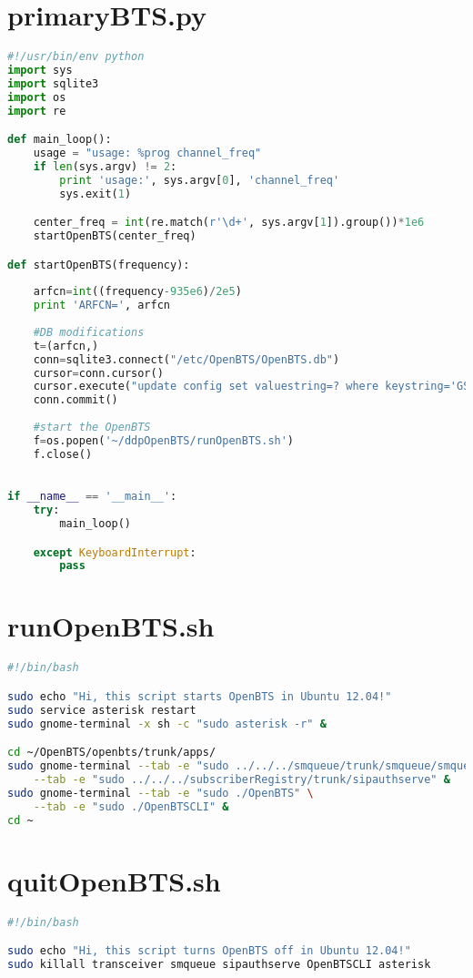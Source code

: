 \section{primaryBTS.py}
\begin{lstlisting}[language=Python]
#!/usr/bin/env python
import sys
import sqlite3
import os
import re

def main_loop():
    usage = "usage: %prog channel_freq"
    if len(sys.argv) != 2:
        print 'usage:', sys.argv[0], 'channel_freq'
        sys.exit(1)

    center_freq = int(re.match(r'\d+', sys.argv[1]).group())*1e6
    startOpenBTS(center_freq)

def startOpenBTS(frequency):            
    
    arfcn=int((frequency-935e6)/2e5)
    print 'ARFCN=', arfcn
    
    #DB modifications
    t=(arfcn,)
    conn=sqlite3.connect("/etc/OpenBTS/OpenBTS.db")
    cursor=conn.cursor()
    cursor.execute("update config set valuestring=? where keystring='GSM.Radio.C0'",t)
    conn.commit()
    
    #start the OpenBTS
    f=os.popen('~/ddpOpenBTS/runOpenBTS.sh')
    f.close()
              

if __name__ == '__main__':
    try:
        main_loop()

    except KeyboardInterrupt:
        pass
\end{lstlisting}


\section{runOpenBTS.sh}
\begin{lstlisting}[language=bash]
#!/bin/bash

sudo echo "Hi, this script starts OpenBTS in Ubuntu 12.04!"
sudo service asterisk restart
sudo gnome-terminal -x sh -c "sudo asterisk -r" &

cd ~/OpenBTS/openbts/trunk/apps/
sudo gnome-terminal --tab -e "sudo ../../../smqueue/trunk/smqueue/smqueue" \
    --tab -e "sudo ../../../subscriberRegistry/trunk/sipauthserve" &
sudo gnome-terminal --tab -e "sudo ./OpenBTS" \
    --tab -e "sudo ./OpenBTSCLI" &
cd ~
\end{lstlisting}


\section{quitOpenBTS.sh}
\begin{lstlisting}[language=bash]
#!/bin/bash

sudo echo "Hi, this script turns OpenBTS off in Ubuntu 12.04!"
sudo killall transceiver smqueue sipauthserve OpenBTSCLI asterisk
\end{lstlisting}

